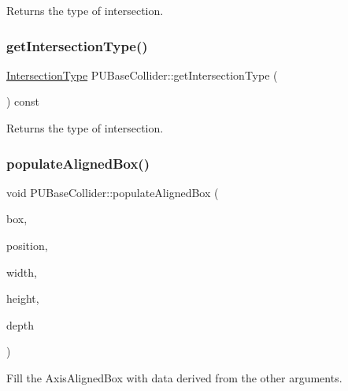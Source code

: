 Returns the type of intersection. \mbox{\label{classPUBaseCollider_af904a3220f053c0d5c3b83e54c91b001}} 
\subsubsection{\texorpdfstring{get\+Intersection\+Type()}{getIntersectionType()}\hspace{0.1cm}{\footnotesize\ttfamily [2/2]}}
{\footnotesize\ttfamily \hyperlink{classPUBaseCollider_ae86fc81f78c00a88e8e927377a86e81c}{Intersection\+Type} P\+U\+Base\+Collider\+::get\+Intersection\+Type (\begin{DoxyParamCaption}{ }\end{DoxyParamCaption}) const}

Returns the type of intersection. \mbox{\label{classPUBaseCollider_a070c2f0ca1a3c55774153b38baec956b}} 
\subsubsection{\texorpdfstring{populate\+Aligned\+Box()}{populateAlignedBox()}\hspace{0.1cm}{\footnotesize\ttfamily [1/2]}}
{\footnotesize\ttfamily void P\+U\+Base\+Collider\+::populate\+Aligned\+Box (\begin{DoxyParamCaption}\item[{\hyperlink{classAABB}{A\+A\+BB} \&}]{box,  }\item[{const \hyperlink{classVec3}{Vec3} \&}]{position,  }\item[{const float}]{width,  }\item[{const float}]{height,  }\item[{const float}]{depth }\end{DoxyParamCaption})}

Fill the Axis\+Aligned\+Box with data derived from the other arguments. \mbox{\label{classPUBaseCollider_a070c2f0ca1a3c55774153b38baec956b}} 

